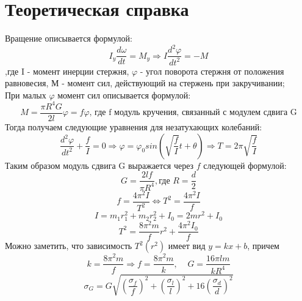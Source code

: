 \documentclass[a4paper,14pt]{extarticle}
\begin{document}
		\section{Теоретическая справка}
	\begin{centering}
	Вращение описывается формулой:$$I_y\frac{d\omega}{dt} = M_y \Rightarrow I\frac{d^2\varphi}{dt^2} = -M$$
	,где I - момент инерции стержня, $\varphi$ - угол поворота стержня от положения равновесия, М - момент сил, действующий на стержень при закручивании; 
	\\При малых $\varphi$ момент сил описывается формулой: $$M = \frac{\pi R^4 G}{2l}\varphi = f\varphi \text{, где f модуль кручения, связанный с модулем сдвига G}$$
	Тогда получаем следующие уравнения для незатухающих колебаний: $$\frac{d^2\varphi}{dt^2} + \frac{f}{I} = 0 \Rightarrow \varphi = \varphi_0 sin(\sqrt{\frac{f}{I}}t + \theta) \Rightarrow T = 2\pi \sqrt{\frac{f}{I}}$$
	Таким образом модуль сдвига G выражается через $f$ следующей формулой: $$G = \frac{2lf}{\pi R^4}, \text{где  } R = \frac{d}{2}$$
	$$f = \frac{4\pi^2 I}{T^2} \Leftrightarrow T^2 = \frac{4\pi^2 I}{f}$$
	$$I = m_1r_1^2 + m_2r_2^2 +I_0 = 2mr^2 + I_0$$
	$$T^2 = \frac{8\pi^2m}{f}r^2 + \frac{4\pi^2 I_0}{f}$$
	Можно заметить, что зависимость $T^2(r^2)$ имеет вид $y = kx + b$, причем $$k = \frac{8\pi^2m}{f}\Rightarrow f = \frac{8\pi^2m}{k}, \;\;\;\; G = \frac{16\pi l m}{ k R^4} $$
	$$\sigma_G = G\sqrt{(\frac{\sigma_f}{f})^2 + (\frac{\sigma_l}{l})^2 + 16(\frac{\sigma_d}{d})^2}$$
	\end{centering}
\newpage
\end{document}

